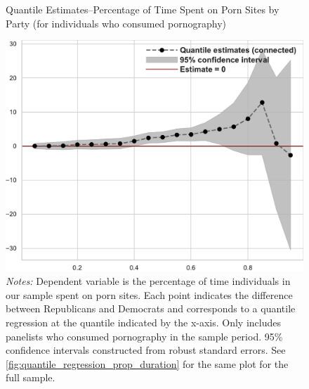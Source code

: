 \documentclass[12pt, letterpaper]{article}
\begin{document}
\begin{figure}[ht]
	\centering
	\caption{Quantile Estimates--Percentage of Time Spent on Porn Sites by Party (for individuals who consumed pornography)}
	\includegraphics[width=.55\linewidth]{../figs/quantile_reg_nonzero_proportion_duration_adult.pdf}
	\caption*{\footnotesize \emph{Notes:} 
		Dependent variable is the percentage of time individuals in our sample spent on porn sites.
		Each point indicates the difference between Republicans and Democrats and corresponds to a quantile regression at the quantile indicated by the x-axis.
		Only includes panelists who consumed pornography in the sample period.
		95\% confidence intervals constructed from robust standard errors.
		See \cref{fig:quantile_regression_prop_duration} for the same plot for the full sample.
	}
	\label{fig:quantile_regression_prop_duration_nonzeroes}
\end{figure}
\end{document}
